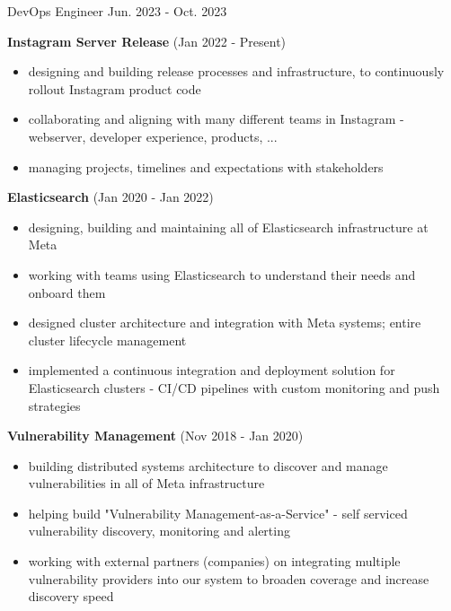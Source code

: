 \begin{cventries}
  \cventry
    {DevOps Engineer} %
    {} %
    {} %
    {Jun. 2023 - Oct. 2023} %
  {
    \begin{cvitems} %
      \item {
        \textbf{Instagram Server Release} (Jan 2022 - Present)
        \begin{itemize}
          \item {designing and building release processes and infrastructure, to continuously rollout Instagram product code}
          \item {collaborating and aligning with many different teams in Instagram - webserver, developer experience, products, ...}
          \item {managing projects, timelines and expectations with stakeholders}
        \end{itemize}
      }
      \item {
        \textbf{Elasticsearch} (Jan 2020 - Jan 2022)
        \begin{itemize}
          \item {designing, building and maintaining all of Elasticsearch infrastructure at Meta}
          \item {working with teams using Elasticsearch to understand their needs and onboard them}
          \item {designed cluster architecture and integration with Meta systems; entire cluster lifecycle management}
          \item {implemented a continuous integration and deployment solution for Elasticsearch clusters - CI/CD pipelines with custom monitoring and push strategies}
        \end{itemize}
      }
      \item {
        \textbf{Vulnerability Management} (Nov 2018 - Jan 2020)
        \begin{itemize}
          \item {building distributed systems architecture to discover and manage vulnerabilities in all of Meta infrastructure}
          \item {helping build "Vulnerability Management-as-a-Service" - self serviced vulnerability discovery, monitoring and alerting}
          \item {working with external partners (companies) on integrating multiple vulnerability providers into our system to broaden coverage and increase discovery speed}

\end{itemize}}
\end{cvitems}}
\end{cventries}
